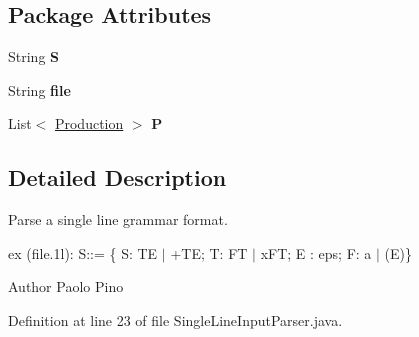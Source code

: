 \subsection*{Package Attributes}
\begin{DoxyCompactItemize}
\item 
\hypertarget{classinput_parser_1_1_single_line_input_parser_afaca00d01ba13c5fc39fe11309aba895}{String {\bfseries S}}\label{classinput_parser_1_1_single_line_input_parser_afaca00d01ba13c5fc39fe11309aba895}

\item 
\hypertarget{classinput_parser_1_1_single_line_input_parser_a46401abfc8915fde62cc6109f520028a}{String {\bfseries file}}\label{classinput_parser_1_1_single_line_input_parser_a46401abfc8915fde62cc6109f520028a}

\item 
\hypertarget{classinput_parser_1_1_single_line_input_parser_a07d3d934d89d64a72eb0a06b89e684a8}{List$<$ \hyperlink{classcontext_free_1_1grammar_1_1_production}{Production} $>$ {\bfseries P}}\label{classinput_parser_1_1_single_line_input_parser_a07d3d934d89d64a72eb0a06b89e684a8}

\end{DoxyCompactItemize}


\subsection{Detailed Description}
Parse a single line grammar format. 

ex (file.\-1l)\-: S\-:\-:= \{ S\-: T\-E $|$ +\-T\-E; T\-: F\-T $|$ x\-F\-T; E \-: eps; F\-: a $|$ (E)\} \begin{DoxyAuthor}{Author}
Paolo Pino 
\end{DoxyAuthor}


Definition at line 23 of file Single\-Line\-Input\-Parser.\-java.



